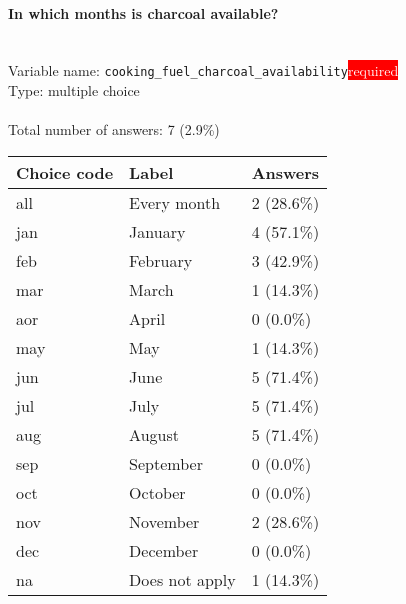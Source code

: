 \documentclass[11.5pt, a4paper]{scrartcl}
\begin{document}
\paragraph{In which months is charcoal available?}
\  \\Variable name: \texttt{cooking\_fuel\_charcoal\_availability}\hfill\colorbox{red}{\small{\textcolor{white}{required}}}\\
 Type: multiple choice\\
\\Total number of answers: 7 (2.9\%)
\\[0.2em] \begin{tabular}{p{4cm}|p{8cm}|p{3cm}}
Choice code & Label & Answers \\
\hline
all & Every month& \cellcolor{color1}2 (28.6\%)\\
\cellcolor{mygray} jan & \cellcolor{mygray}January & \cellcolor{color2}4 (57.1\%)\\
feb & February& \cellcolor{color2}3 (42.9\%)\\
\cellcolor{mygray} mar & \cellcolor{mygray}March & \cellcolor{color0}1 (14.3\%)\\
aor & April& \cellcolor{color0}0 (0.0\%)\\
\cellcolor{mygray} may & \cellcolor{mygray}May & \cellcolor{color0}1 (14.3\%)\\
jun & June& \cellcolor{color3}5 (71.4\%)\\
\cellcolor{mygray} jul & \cellcolor{mygray}July & \cellcolor{color3}5 (71.4\%)\\
aug & August& \cellcolor{color3}5 (71.4\%)\\
\cellcolor{mygray} sep  & \cellcolor{mygray}September & \cellcolor{color0}0 (0.0\%)\\
oct  & October& \cellcolor{color0}0 (0.0\%)\\
\cellcolor{mygray} nov & \cellcolor{mygray}November & \cellcolor{color1}2 (28.6\%)\\
dec  & December& \cellcolor{color0}0 (0.0\%)\\
\cellcolor{mygray} na & \cellcolor{mygray}Does not apply & \cellcolor{color0}1 (14.3\%)\\
\end{tabular}
\end{document}
